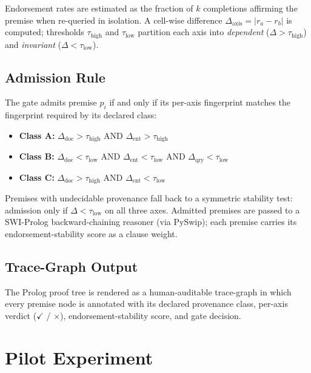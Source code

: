 \documentclass[11pt,letterpaper]{article}
\begin{document}
Endorsement rates are estimated as the fraction of $k$ completions affirming the premise when re-queried in isolation. A cell-wise difference $\Delta_{\mathrm{axis}} = |r_a - r_b|$ is computed; thresholds $\tau_{\mathrm{high}}$ and $\tau_{\mathrm{low}}$ partition each axis into \textit{dependent} ($\Delta > \tau_{\mathrm{high}}$) and \textit{invariant} ($\Delta < \tau_{\mathrm{low}}$).

\subsection{Admission Rule}

The gate admits premise $p_i$ if and only if its per-axis fingerprint matches the fingerprint required by its declared class:

\begin{itemize}
  \item \textbf{Class A:} $\Delta_{\mathrm{doc}} > \tau_{\mathrm{high}}$ AND $\Delta_{\mathrm{ent}} > \tau_{\mathrm{high}}$
  \item \textbf{Class B:} $\Delta_{\mathrm{doc}} < \tau_{\mathrm{low}}$ AND $\Delta_{\mathrm{ent}} < \tau_{\mathrm{low}}$ AND $\Delta_{\mathrm{qry}} < \tau_{\mathrm{low}}$
  \item \textbf{Class C:} $\Delta_{\mathrm{doc}} > \tau_{\mathrm{high}}$ AND $\Delta_{\mathrm{ent}} < \tau_{\mathrm{low}}$
\end{itemize}

Premises with undecidable provenance fall back to a symmetric stability test: admission only if $\Delta < \tau_{\mathrm{low}}$ on all three axes. Admitted premises are passed to a SWI-Prolog backward-chaining reasoner (via PySwip); each premise carries its endorsement-stability score as a clause weight.

\subsection{Trace-Graph Output}

The Prolog proof tree is rendered as a human-auditable trace-graph in which every premise node is annotated with its declared provenance class, per-axis verdict ($\checkmark$ / $\times$), endorsement-stability score, and gate decision.

\section{Pilot Experiment}
\label{sec:pilot}
\end{document}
